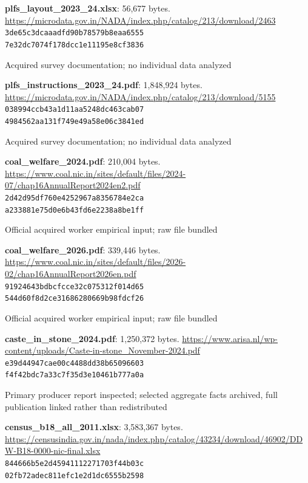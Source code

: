 \documentclass[11pt,a4paper]{report}
\begin{document}
\textbf{plfs\_layout\_2023\_24.xlsx}: 56,677 bytes. \url{https://microdata.gov.in/NADA/index.php/catalog/213/download/2463}\\
\texttt{3de65c3dcaaadfd90b78579b8eaa6555}\\\texttt{7e32dc7074f178dcc1e11195e8cf3836}

Acquired survey documentation; no individual data analyzed

\textbf{plfs\_instructions\_2023\_24.pdf}: 1,848,924 bytes. \url{https://microdata.gov.in/NADA/index.php/catalog/213/download/5155}\\
\texttt{038994ccb43a1d11aa5248dc463cab07}\\\texttt{4984562aa131f749e49a58e06c3841ed}

Acquired survey documentation; no individual data analyzed

\textbf{coal\_welfare\_2024.pdf}: 210,004 bytes. \url{https://www.coal.nic.in/sites/default/files/2024-07/chap16AnnualReport2024en2.pdf}\\
\texttt{2d42d95df760e4252967a8356784e2ca}\\\texttt{a233881e75d0e6b43fd6e2238a8be1ff}

Official acquired worker empirical input; raw file bundled

\textbf{coal\_welfare\_2026.pdf}: 339,446 bytes. \url{https://www.coal.nic.in/sites/default/files/2026-02/chap16AnnualReport2026en.pdf}\\
\texttt{91924643bdbcfcce32c075312f014d65}\\\texttt{544d60f8d2ce31686280669b98fdcf26}

Official acquired worker empirical input; raw file bundled

\textbf{caste\_in\_stone\_2024.pdf}: 1,250,372 bytes. \url{https://www.arisa.nl/wp-content/uploads/Caste-in-stone_November-2024.pdf}\\
\texttt{e39d44947cae00c4488dd38b65096603}\\\texttt{f4f42bdc7a33c7f35d3e10461b777a0a}

Primary producer report inspected; selected aggregate facts archived, full publication linked rather than redistributed

\textbf{census\_b18\_all\_2011.xlsx}: 3,583,367 bytes. \url{https://censusindia.gov.in/nada/index.php/catalog/43234/download/46902/DDW-B18-0000-nic-final.xlsx}\\
\texttt{844666b5e2d45941112271703f44b03c}\\\texttt{02fb72adec811efc1e2d1dc6555b2598}
\end{document}
